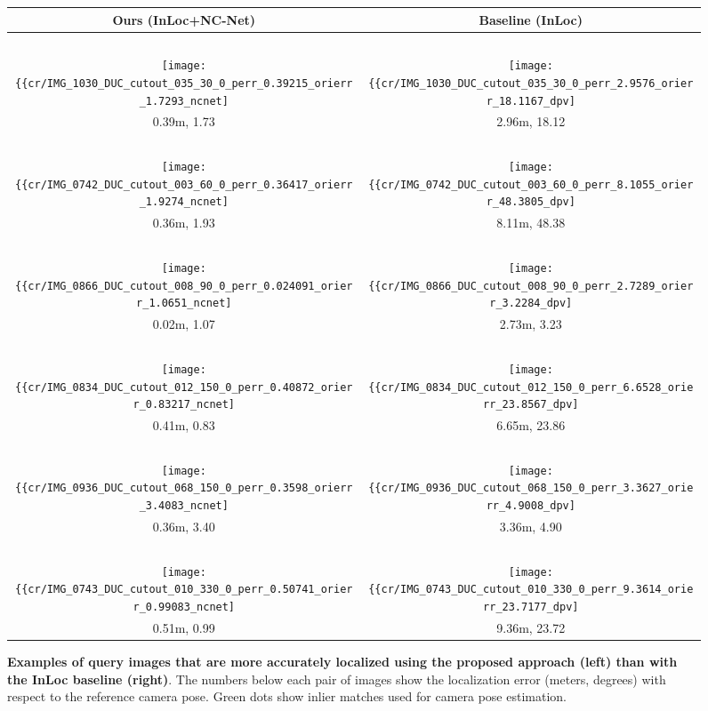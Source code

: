 \documentclass{article}
\begin{document}
\begin{figure}[tbp]
  \centering
  \begingroup
  \renewcommand{\arraystretch}{0.5}
  \begin{tabular}{@{\hskip 1pt}c@{\hskip 6pt}|@{\hskip 6pt}c@{\hskip 1pt}}
    Ours (InLoc+NC-Net) & Baseline (InLoc) \\ \hline
     ~ & ~ \\ 
    \texttt{[image: \{\{cr/IMG\_1030\_DUC\_cutout\_035\_30\_0\_perr\_0.39215\_orierr\_1.7293\_ncnet]}}} &    \texttt{[image: \{\{cr/IMG\_1030\_DUC\_cutout\_035\_30\_0\_perr\_2.9576\_orierr\_18.1167\_dpv]}}} \\
    0.39m, 1.73 & 2.96m, 18.12 \\ \hline
    ~ & ~ \\ 
    \texttt{[image: \{\{cr/IMG\_0742\_DUC\_cutout\_003\_60\_0\_perr\_0.36417\_orierr\_1.9274\_ncnet]}}} &    \texttt{[image: \{\{cr/IMG\_0742\_DUC\_cutout\_003\_60\_0\_perr\_8.1055\_orierr\_48.3805\_dpv]}}} \\
    0.36m, 1.93 & 8.11m, 48.38 \\ \hline
    ~ & ~ \\ 
    \texttt{[image: \{\{cr/IMG\_0866\_DUC\_cutout\_008\_90\_0\_perr\_0.024091\_orierr\_1.0651\_ncnet]}}} &    \texttt{[image: \{\{cr/IMG\_0866\_DUC\_cutout\_008\_90\_0\_perr\_2.7289\_orierr\_3.2284\_dpv]}}} \\
    0.02m, 1.07 & 2.73m, 3.23 \\ \hline
    ~ & ~ \\ 
    \texttt{[image: \{\{cr/IMG\_0834\_DUC\_cutout\_012\_150\_0\_perr\_0.40872\_orierr\_0.83217\_ncnet]}}} &    \texttt{[image: \{\{cr/IMG\_0834\_DUC\_cutout\_012\_150\_0\_perr\_6.6528\_orierr\_23.8567\_dpv]}}} \\
    0.41m, 0.83 & 6.65m, 23.86 \\ \hline
    ~ & ~ \\ 
    \texttt{[image: \{\{cr/IMG\_0936\_DUC\_cutout\_068\_150\_0\_perr\_0.3598\_orierr\_3.4083\_ncnet]}}} &    \texttt{[image: \{\{cr/IMG\_0936\_DUC\_cutout\_068\_150\_0\_perr\_3.3627\_orierr\_4.9008\_dpv]}}} \\
    0.36m, 3.40 & 3.36m, 4.90 \\ \hline
    ~ & ~ \\ 
    \texttt{[image: \{\{cr/IMG\_0743\_DUC\_cutout\_010\_330\_0\_perr\_0.50741\_orierr\_0.99083\_ncnet]}}} &    \texttt{[image: \{\{cr/IMG\_0743\_DUC\_cutout\_010\_330\_0\_perr\_9.3614\_orierr\_23.7177\_dpv]}}} \\
    0.51m, 0.99 & 9.36m, 23.72 
  \end{tabular}
  \endgroup
  \vspace{2pt}
  \caption{{\bf Examples of query images that are more accurately localized using the proposed approach (left) than with the InLoc baseline (right)}. The numbers below each pair of images show the localization error (meters, degrees) with respect to the reference camera pose. Green dots show inlier matches used for camera pose estimation.}
  \label{fig:densePV}
\end{figure}
\end{document}
